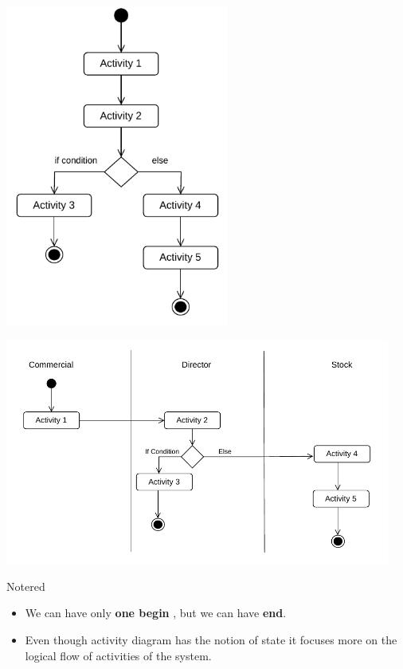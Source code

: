 \vspace{1cm}

\begin{center}
\includegraphics[width=0.55\textwidth,height=0.6\textheight]{Chapters/Diagram/AC/ac1.drawio.pdf}
\end{center}

\begin{center}
\includegraphics[width=0.95\textwidth,height=0.65\textheight]{Chapters/Diagram/AC/ac2.drawio.pdf}
\end{center}



\vspace{0.25cm}

\begin{prettyBox}{Note}{red}
\begin{itemize}
    \item We can have only \textbf{one begin} , but we can have \textbf{end}.
    \item Even though activity diagram has the notion of state it focuses more on the 
    logical flow of activities of the system.
\end{itemize}
\end{prettyBox}



